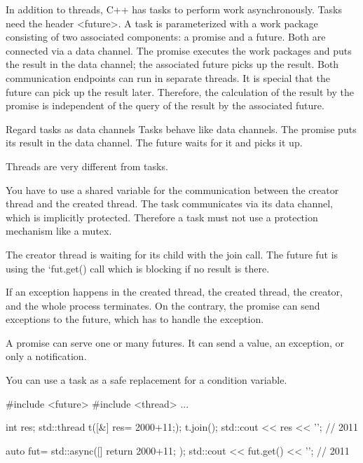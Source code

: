In addition to threads, C++ has tasks to perform work asynchronously. Tasks need the header <future>. A task is parameterized with a work package consisting of two associated components: a promise and a future. Both are connected via a data channel. The promise executes the work packages and puts the result in the data channel; the associated future picks up the result. Both communication endpoints can run in separate threads. It is special that the future can pick up the result later. Therefore, the calculation of the result by the promise is independent of the query of the result by the associated future.

\begin{myTip}{Regard tasks as data channels}
Tasks behave like data channels. The promise puts its result in the data channel. The future waits for it and picks it up.

\end{myTip}


Threads are very different from tasks.

You have to use a shared variable for the communication between the creator thread and the created thread. The task communicates via its data channel, which is implicitly protected. Therefore a task must not use a protection mechanism like a mutex.

The creator thread is waiting for its child with the join call. The future fut is using the ‘fut.get() call which is blocking if no result is there.

If an exception happens in the created thread, the created thread, the creator, and the whole process terminates. On the contrary, the promise can send exceptions to the future, which has to handle the exception.

A promise can serve one or many futures. It can send a value, an exception, or only a notification.

You can use a task as a safe replacement for a condition variable.

\begin{cpp}
#include <future>
#include <thread>
...

int res;
std::thread t([&]{ res= 2000+11;});
t.join();
std::cout << res << '\n'; // 2011

auto fut= std::async([]{ return 2000+11; });
std::cout << fut.get() << '\n'; // 2011
\end{cpp}

